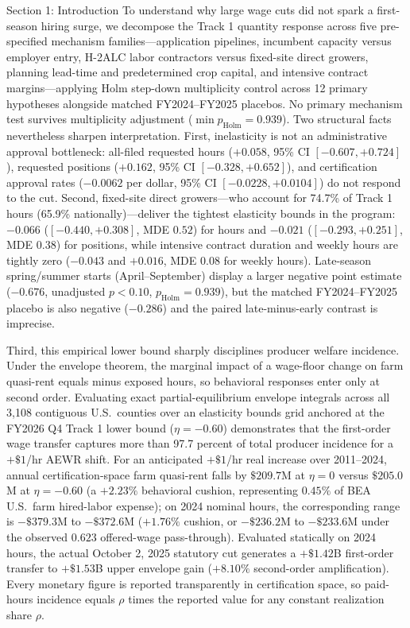 \begin{llmdraft}{Section 1: Introduction}
To understand why large wage cuts did not spark a first-season hiring surge, we
decompose the Track 1 quantity response across five pre-specified mechanism
families---application pipelines, incumbent capacity versus employer entry,
H-2ALC labor contractors versus fixed-site direct growers, planning lead-time
and predetermined crop capital, and intensive contract margins---applying Holm
step-down multiplicity control across 12 primary hypotheses alongside matched
FY2024--FY2025 placebos. No primary mechanism test survives multiplicity
adjustment ($\min p_{\text{Holm}} = 0.939$). Two structural facts nevertheless
sharpen interpretation. First, inelasticity is not an administrative approval
bottleneck: all-filed requested hours ($+0.058$, 95\% CI $[-0.607, +0.724]$),
requested positions ($+0.162$, 95\% CI $[-0.328, +0.652]$), and certification
approval rates ($-0.0062$ per dollar, 95\% CI $[-0.0228, +0.0104]$) do not
respond to the cut. Second, fixed-site direct growers---who account for 74.7\%
of Track 1 hours (65.9\% nationally)---deliver the tightest elasticity bounds
in the program: $-0.066$ ($[-0.440, +0.308]$, MDE $0.52$) for hours and
$-0.021$ ($[-0.293, +0.251]$, MDE $0.38$) for positions, while intensive
contract duration and weekly hours are tightly zero ($-0.043$ and $+0.016$,
MDE $0.08$ for weekly hours). Late-season spring/summer starts (April--September)
display a larger negative point estimate ($-0.676$, unadjusted $p<0.10$,
$p_{\text{Holm}}=0.939$), but the matched FY2024--FY2025 placebo is also
negative ($-0.286$) and the paired late-minus-early contrast is imprecise.

Third, this empirical lower bound sharply disciplines producer welfare
incidence. Under the envelope theorem, the marginal impact of a wage-floor
change on farm quasi-rent equals minus exposed hours, so behavioral responses
enter only at second order. Evaluating exact partial-equilibrium envelope
integrals across all 3,108 contiguous U.S.\ counties over an elasticity bounds
grid anchored at the FY2026 Q4 Track 1 lower bound ($\eta = -0.60$) demonstrates
that the first-order wage transfer captures more than 97.7 percent of total
producer incidence for a $+\$1$/hr AEWR shift. For an anticipated $+\$1$/hr
real increase over 2011--2024, annual certification-space farm quasi-rent falls
by $\$209.7$M at $\eta=0$ versus $\$205.0$M at $\eta=-0.60$ (a $+2.23\%$
behavioral cushion, representing $0.45\%$ of BEA U.S.\ farm hired-labor
expense); on 2024 nominal hours, the corresponding range is $-\$379.3$M to
$-\$372.6$M ($+1.76\%$ cushion, or $-\$236.2$M to $-\$233.6$M under the
observed $0.623$ offered-wage pass-through). Evaluated statically on 2024
hours, the actual October 2, 2025 statutory cut generates a $+\$1.42$B
first-order transfer to $+\$1.53$B upper envelope gain ($+8.10\%$ second-order
amplification). Every monetary figure is reported transparently in
certification space, so paid-hours incidence equals $\rho$ times the reported
value for any constant realization share $\rho$.


\end{llmdraft}
